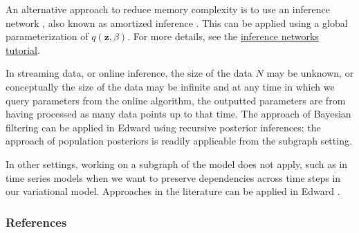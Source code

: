 An alternative approach to reduce memory complexity is to use an
inference network \citep{dayan1995helmholtz}, also known as
amortized inference \citep{stuhlmuller2013learning}.  This can be
applied using a global parameterization of $q(\mathbf{z}, \beta)$.
For more details, see the
\href{/tutorials/inference-networks}{inference networks tutorial}.

In streaming data, or online inference, the size of the data $N$
may be unknown, or conceptually the size of the data may be
infinite and at any time in which we query parameters from the online
algorithm, the outputted parameters are from having processed as many
data points up to that time.
The approach of Bayesian filtering
\citep{doucet2000on,broderick2013streaming} can be applied in Edward using
recursive posterior inferences; the approach of population posteriors
\citep{mcinerney2015population} is readily applicable from the subgraph
setting.

In other settings, working on a subgraph of the model does not
apply, such as in time series models when we want to
preserve dependencies across time steps in our variational model.
Approaches in the literature can be applied in Edward
\citep{binder1997space,johnson2014stochastic,foti2014stochastic}.

\subsubsection{References}\label{references}
